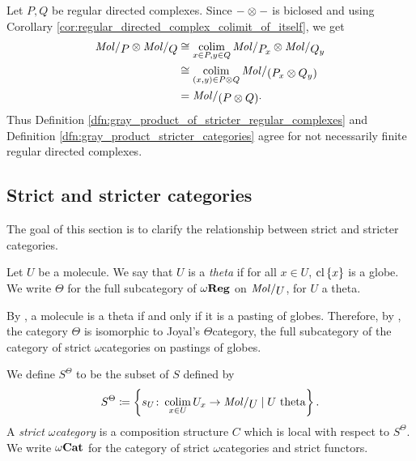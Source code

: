 \begin{rmk}
    Let \( P, Q \) be regular directed complexes.
    Since \( - \otimes - \) is biclosed and using Corollary \ref{cor:regular_directed_complex_colimit_of_itself}, we get
    \begin{align*}
        \molecin{P} \gray \molecin{Q} &\cong \colim_{x \in P, y \in Q} \molecin{\imel{P}{x}} \gray \molecin{\imel{Q}{y}} \\
                                      &\cong \colim_{(x, y) \in P \gray Q} \molecin{(\imel{P}{x} \gray \imel{Q}{y})} \\
                                      &= \molecin{(P \gray Q)}.
    \end{align*}
    Thus Definition \ref{dfn:gray_product_of_stricter_regular_complexes} and Definition \ref{dfn:gray_product_stricter_categories} agree for not necessarily finite regular directed complexes.
\end{rmk}

\subsection{Strict and stricter categories}

The goal of this section is to clarify the relationship between strict and stricter categories.

\begin{dfn} [Theta]
    Let \( U \) be a molecule.
    We say that \( U \) is a \emph{theta} if for all \( x \in U \), \( \mathrm{cl}\left\{ {x} \right\} \) is a globe.
    We write \( \Theta \) for the full subcategory of \( \omega\mathbf{Reg} \) on \( \molecin{U} \), for \( U \) a theta.
\end{dfn}

\begin{rmk} \label{rmk:theta_is_theta}
    By \cite[Corollary 9.1.29]{hadzihasanovic2024combinatorics}, a molecule is a theta if and only if it is a pasting of globes.
    Therefore, by \cite[Theorem 8.2.14, Lemma 9.1.16]{hadzihasanovic2024combinatorics}, the category \( \Theta \) is isomorphic to Joyal's \( \Theta \)\nbd category, the full subcategory of the category of strict \( \omega \)\nbd categories on pastings of globes.  
\end{rmk}

\begin{dfn} 
    We define \( S^\Theta \) to be the subset of \( S \) defined by 
    \begin{equation*}
        S^\Theta \eqdef \set{s_U \colon \colim_{x \in U} \imel{U}{x} \to \molecin{U} \mid U \text{ theta}}.
    \end{equation*}  
    A \emph{strict \( \omega \)\nbd category} is a composition structure \( C \) which is local with respect to \( S^\Theta \).
    We write \( {\omega\mathbf{Cat}} \) for the category of strict \( \omega \)\nbd categories and strict functors.
\end{dfn}

